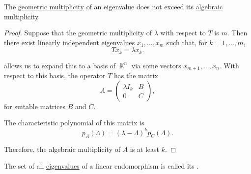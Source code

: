 \begin{proposition}\label{thm:geometric_vs_algebraic_multiplicity}
  The \hyperref[def:characteristic_polynomial]{geometric multiplicity} of an eigenvalue does not exceed its \hyperref[def:characteristic_polynomial]{algebraic multiplicity}.
\end{proposition}
\begin{proof}
  Suppose that the geometric multiplicity of \( \lambda \) with respect to \( T \) is \( m \). Then there exist linearly independent eigenvalues \( x_1, \ldots, x_m \) such that, for \( k = 1, \ldots, m \),
  \begin{equation*}
    T x_k = \lambda x_k.
  \end{equation*}

   allows us to expand this to a basis of \( \BbbK^n \) via some vectors \( x_{m+1}, \ldots, x_n \). With respect to this basis, the operator \( T \) has the matrix
  \begin{equation*}
    A = \begin{pmatrix}
      \lambda I_k & B \\
      0           & C
    \end{pmatrix},
  \end{equation*}
  for suitable matrices \( B \) and \( C \).

  The characteristic polynomial of this matrix is
  \begin{equation*}
    p_A(\Lambda) = (\lambda - \Lambda)^k p_C(\Lambda).
  \end{equation*}

  Therefore, the algebraic multiplicity of \( A \) is at least \( k \).
\end{proof}

\begin{definition}\label{def:point_spectrum}
  The set of all \hyperref[def:eigenpair]{eigenvalues} of a linear endomorphism is called its .
\end{definition}

